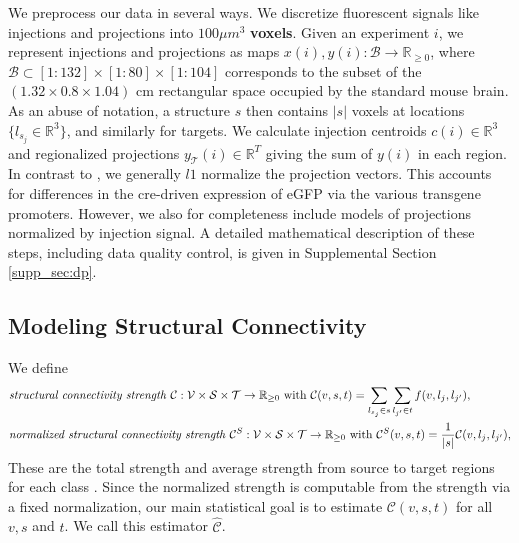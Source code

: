 We preprocess our data in several ways.
We discretize fluorescent signals like injections and projections into $100 \mu m^3$  \textbf{voxels}.
Given an experiment $i$, we represent injections and projections as maps $x(i),y(i) : \mathcal B \to \mathbb R_{\geq 0}$, where $\mathcal B \subset [1:132] \times [1:80] \times [1:104]$ corresponds to the subset of the $(1.32 \times 0.8 \times 1.04)$ cm rectangular space occupied by the standard mouse brain.
As an abuse of notation, a structure $s$ then contains $|s|$ voxels at locations $\{l_{s_j} \in \mathbb R^3\}$, and similarly for targets.
We calculate injection centroids $c(i) \in \mathbb R^3$ and regionalized projections $y_{\mathcal T} (i) \in \mathbb R^{T} $ giving the sum of $y(i)$ in each region.
In contrast to \citet{Knox2019-ot}, we generally $l1$ normalize the projection vectors.
This accounts for differences in the cre-driven expression of eGFP via the various transgene promoters.
However, we also for completeness include models of projections normalized by injection signal.
A detailed mathematical description of these steps, including data quality control, is given in Supplemental Section \ref{supp_sec:dp}.

\newpage

\subsection{Modeling Structural Connectivity}
We define
\begin{align*}
&\text{\textit {structural connectivity strength} } \mathcal C : \mathcal V \times \mathcal S \times \mathcal T \to \mathbb R_{\geq 0}  \text{ with } \mathcal C(v,s,t) = \sum_{l_{s_j} \in s} \sum_{l_{j'} \in  t} f(v,l_{j},l_{j'}), \\
&\text{\textit {normalized structural connectivity strength} } \mathcal C^S : \mathcal V \times \mathcal S \times \mathcal T \to \mathbb R_{\geq 0}  \text{ with } \mathcal C^S(v,s,t) = \frac{1}{|s|} \mathcal C(v,l_{j},l_{j'}), \\
\end{align*}
These are the total strength and average strength from source to target regions for each class .
Since the normalized strength is computable from the strength via a fixed normalization, our main statistical goal is to estimate $\mathcal C (v,s,t) $ for all $v, s$ and $t$.%
We call this estimator $\widehat { \mathcal C } $.

